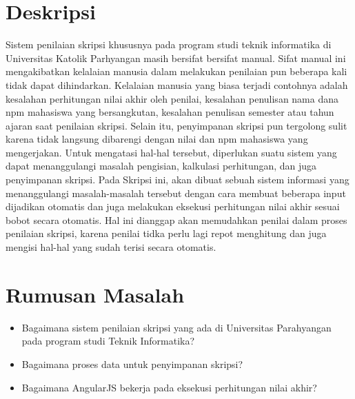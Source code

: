 \documentclass[a4paper,twoside]{article}
\begin{document}
\title{\@judultopik}
\author{\nama \textendash \@npm} 

\newcommand{\nama}{Billy Yanuar}
\newcommand{\@npm}{2012730017}
\newcommand{\@judultopik}{Sistem Operasi Penilaian Skripsi dengan AngularJS} %
\newcommand{\jumpemb}{1} %
\newcommand{\tanggal}{11/02/2016}
\maketitle


\section{Deskripsi}
Sistem penilaian skripsi khususnya pada program studi teknik informatika di Universitas Katolik Parhyangan masih bersifat bersifat manual. Sifat manual ini mengakibatkan kelalaian manusia dalam melakukan penilaian pun beberapa kali tidak dapat dihindarkan. Kelalaian manusia yang biasa terjadi contohnya adalah kesalahan perhitungan nilai akhir oleh penilai, kesalahan penulisan nama dana npm mahasiswa yang bersangkutan, kesalahan penulisan semester atau tahun ajaran saat penilaian skripsi. Selain itu, penyimpanan skripsi pun tergolong sulit karena tidak langsung dibarengi dengan nilai dan npm mahasiswa yang mengerjakan. Untuk mengatasi hal-hal tersebut, diperlukan suatu sistem yang dapat menanggulangi masalah pengisian, kalkulasi perhitungan, dan juga penyimpanan skripsi.
Pada Skripsi ini, akan dibuat sebuah sistem informasi yang menanggulangi masalah-masalah tersebut dengan cara membuat beberapa input dijadikan otomatis dan juga melakukan eksekusi perhitungan nilai akhir sesuai bobot secara otomatis. Hal ini dianggap akan memudahkan penilai dalam proses penilaian skripsi, karena penilai tidka perlu lagi repot menghitung dan juga mengisi hal-hal yang sudah terisi secara otomatis.


\section{Rumusan Masalah}
\begin{itemize}
	\item Bagaimana sistem penilaian skripsi yang ada di Universitas Parahyangan pada program studi Teknik Informatika?
	\item Bagaimana proses data untuk penyimpanan skripsi?
	\item Bagaimana AngularJS bekerja pada eksekusi perhitungan nilai akhir?
\end{itemize}
\end{document}

